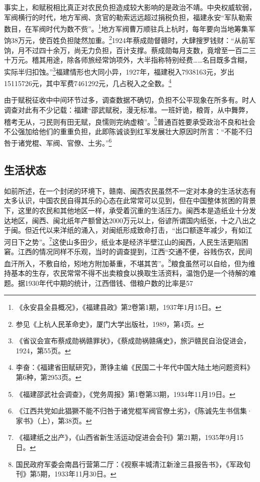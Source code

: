 事实上，和赋税相比真正对农民负担造成较大影响的是政治不靖。中央权威软弱，军阀横行的时代，地方军阀、贪官的勒索远远超过捐税负担，福建永安“军队勒索数目，在军阀时代为数不赀”。\footnote{《永安县全县概况》，《福建县政》第2卷第1期，1937年1月15日。}地方军阀曹万顺驻兵上杭时，每年要向当地筹集军饷38万元，使百姓负担陡然加重。\footnote{参见《上杭人民革命史》，厦门大学出版社，1989，第4页。}1924年蔡成勋督赣时，大肆搜罗钱财：“从前军饷，月不过四十余万，尚无力负担，百计支撑。蔡成勋每月支数，竟增至一百二三十万元。稽其用途，除各师旅经常饷项外，大半指称特别经费……名目既多含糊，实际半归扣蚀。”\footnote{《省议会宣布蔡成勋祸赣罪状》，《蔡成勋祸赣痛史》，旅沪赣民自治促进会，1924，第55页。}福建情形也大同小异，1927年，福建税入7938163元，岁出15115726元，其中军费7461292元，几占税入之全数。\footnote{李奋：《福建省田赋研究》，萧铮主编《民国二十年代中国大陆土地问题资料》第6种，第2953页。}


由于赋税征收中中间环节过多，调查数据不确切，负担不公平现象在所多有。时人调查对此有不少记载：福建“邵武赋税，漫无标准。一班奸诡，粮胥，从中舞弊，稽考无从，刁民则有田无赋，良懦则完纳虚粮”。\footnote{《福建邵武社会调查》，《党务周报》第1卷第33期，1934年11月19日。}普通百姓要承受政治不良和社会不公强加给他们的重重负担，此即陈诚谈到红军发展壮大原因时所言：“不能不归咎于诸党棍、军阀、官僚、土劣。”\footnote{《江西共党如此猖獗不能不归咎于诸党棍军阀官僚土劣》，《陈诚先生书信集·家书》（上），第38页。}

\subsection{生活状态}


如前所述，在一个封闭的环境下，赣南、闽西农民虽然不一定对本身的生活状态有太多认识，中国农民自得其乐的心态在此常常可以见到，但在中国整体贫困的背景下，这里的农民和其他地区一样，承受着沉重的生活压力。闽西本是造纸业十分发达地区，闽西、闽北纸年产额曾达2000万元以上，俗谚所谓国内纸张，十之八出之于闽。但近代以来洋纸的涌入，对闽纸形成致命打击，“出口额逐年减少，有如江河日下之势”。\footnote{《福建纸之出产》，《山西省新生活运动促进会会刊》第21期，1935年9月15日。}这使山多田少，纸业本是经济半壁江山的闽西，人民生活更陷困窘。江西的情况同样不乐观，当时的调查提到，江西“交通不便，谷贱伤农，民间血汗所入，不敷自给，矧地方附加綦重，不堪其苦”。\footnote{国民政府军委会南昌行营第二厅：《视察丰城清江新淦三县报告书》，《军政旬刊》第5期，1933年11月30日。}粮食虽然可以自给，但为维持基本的生存，农民常常不得不出卖粮食以换取生活资料，温饱仍是一个待解的难题。据1930年代中期的统计，江西借钱、借粮户数的比率是57%


